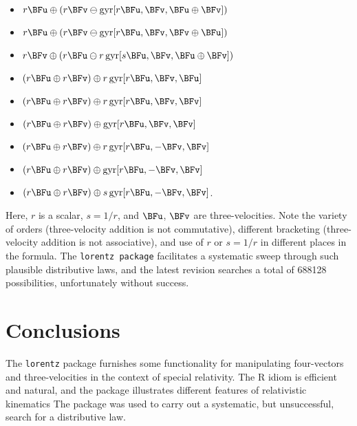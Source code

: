 \documentclass[ijoc,nonblindrev]{informs3} %
\begin{document}
\begin{itemize}
\item $r\BFu  \oplus (r\BFv  \ominus \operatorname{gyr}[r\BFu, \BFv,\BFu\oplus\BFv])$
\item $r\BFu  \oplus (r\BFv  \ominus \operatorname{gyr}[r\BFu, \BFv,\BFv\oplus\BFu])$
\item $r\BFv  \oplus (r\BFu  \ominus r\operatorname{gyr}[s\BFu, \BFv,\BFu\oplus\BFv])$
\item $(r\BFu \oplus r\BFv)  \oplus r\operatorname{gyr}[r\BFu, \BFv,\BFu]$
\item $(r\BFu \oplus r\BFv)  \oplus r\operatorname{gyr}[r\BFu, \BFv,\BFv]$
\item $(r\BFu \oplus r\BFv)  \oplus \operatorname{gyr}[r\BFu, \BFv,\BFv]$
\item $(r\BFu \oplus r\BFv)  \oplus r\operatorname{gyr}[r\BFu,-\BFv,\BFv]$
\item $(r\BFu \oplus r\BFv)  \oplus   \operatorname{gyr}[r\BFu,-\BFv,\BFv]$
\item $(r\BFu \oplus r\BFv)  \oplus s\operatorname{gyr}[r\BFu,-\BFv,\BFv]$.
\end{itemize}

Here, $r$ is a scalar, $s=1/r$, and $\BFu$, $\BFv$ are three-velocities.
Note the variety of orders (three-velocity addition is not
commutative), different bracketing (three-velocity addition is not
associative), and use of $r$ or $s=1/r$ in different places in the
formula.  The {\tt lorentz package} facilitates a systematic sweep
through such plausible distributive laws, and the latest revision
searches a total of 688128 possibilities, unfortunately without
success.

\section{Conclusions}

The {\tt lorentz} package furnishes some functionality for
manipulating four-vectors and three-velocities in the context of
special relativity.  The R idiom is efficient and natural, and the
package illustrates different features of relativistic kinematics 
The package was used to carry out a systematic, but unsuccessful,
search for a distributive law.


%
%
%
\end{document}
